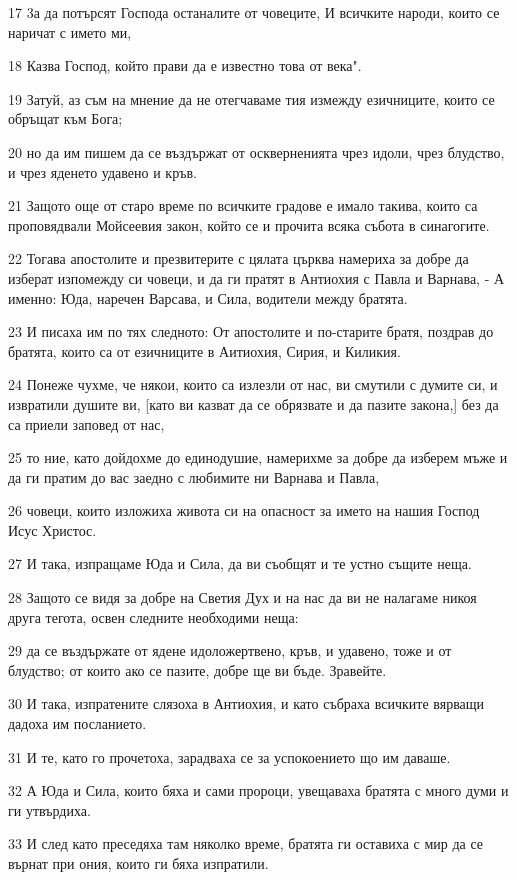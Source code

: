 \par 17 3а да потърсят Господа останалите от човеците, И всичките народи, които се наричат с името ми,
\par 18 Казва Господ, който прави да е известно това от века".
\par 19 Затуй, аз съм на мнение да не отегчаваме тия измежду езичниците, които се обръщат към Бога;
\par 20 но да им пишем да се въздържат от оскверненията чрез идоли, чрез блудство, и чрез яденето удавено и кръв.
\par 21 Защото още от старо време по всичките градове е имало такива, които са проповядвали Мойсеевия закон, който се и прочита всяка събота в синагогите.
\par 22 Тогава апостолите и презвитерите с цялата църква намериха за добре да изберат изпомежду си човеци, и да ги пратят в Антиохия с Павла и Варнава, - А именно: Юда, наречен Варсава, и Сила, водители между братята.
\par 23 И писаха им по тях следното: От апостолите и по-старите братя, поздрав до братята, които са от езичниците в Аитиохия, Сирия, и Киликия.
\par 24 Понеже чухме, че някои, които са излезли от нас, ви смутили с думите си, и извратили душите ви, [като ви казват да се обрязвате и да пазите закона,] без да са приели заповед от нас,
\par 25 то ние, като дойдохме до единодушие, намерихме за добре да изберем мъже и да ги пратим до вас заедно с любимите ни Варнава и Павла,
\par 26 човеци, които изложиха живота си на опасност за името на нашия Господ Исус Христос.
\par 27 И така, изпращаме Юда и Сила, да ви съобщят и те устно същите неща.
\par 28 Защото се видя за добре на Светия Дух и на нас да ви не налагаме никоя друга тегота, освен следните необходими неща:
\par 29 да се въздържате от ядене идоложертвено, кръв, и удавено, тоже и от блудство; от които ако се пазите, добре ще ви бъде. Зравейте.
\par 30 И така, изпратените слязоха в Антиохия, и като събраха всичките вярващи дадоха им посланието.
\par 31 И те, като го прочетоха, зарадваха се за успокоението що им даваше.
\par 32 А Юда и Сила, които бяха и сами пророци, увещаваха братята с много думи и ги утвърдиха.
\par 33 И след като преседяха там няколко време, братята ги оставиха с мир да се върнат при ония, които ги бяха изпратили.
